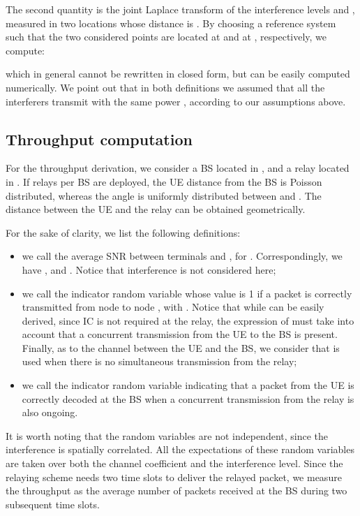 \documentclass[12pt, letterpaper, onecolumn, draftcls]{IEEEtran}
\begin{document}
The second quantity is the joint Laplace transform of the interference levels  and , measured in two locations whose distance is . By choosing a reference system such that the two considered points are located at  and at , respectively, we compute:

which in general cannot be rewritten in closed form, but can be easily computed numerically. We point out that in both definitions we assumed that all the interferers transmit with the same power , according to our assumptions above.

\subsection{Throughput computation}
For the throughput derivation, we consider a BS located in , and a relay located in . If  relays per BS are deployed, the UE distance  from the BS is Poisson distributed, whereas the angle  is uniformly distributed between  and . The distance  between the UE and the relay can be obtained geometrically.

For the sake of clarity, we list the following definitions:
\begin{itemize}
 \item we call  the average SNR between terminals  and , for . Correspondingly, we have ,  and . Notice that interference is not considered here;
 \item we call  the indicator random variable whose value is 1 if a packet is correctly transmitted from node  to node , with . Notice that while  can be easily derived, since IC is not required at the relay, the expression of  must take into account that a concurrent transmission from the UE to the BS is present. Finally, as to the channel between the UE and the BS, we consider that  is used when there is no simultaneous transmission from the relay;
 \item we call  the indicator random variable indicating that a packet from the UE is correctly decoded at the BS when a concurrent transmission from the relay is also ongoing.
\end{itemize}
It is worth noting that the random variables  are not independent, since the interference is spatially correlated. All the expectations of these random variables are taken over both the channel coefficient and the interference level.
Since the relaying scheme needs two time slots to deliver the relayed packet, we measure the throughput as the average number of packets received at the BS during two subsequent time slots.
\end{document}
